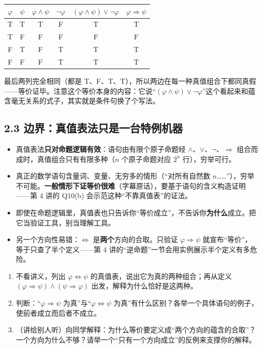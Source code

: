 \documentclass[UTF8,a4paper,11pt]{ctexart}
\begin{document}
\begin{center}
\begin{tabular}{cc|c|c|c|c}
\toprule
$\varphi$ & $\psi$ & $\varphi \land \psi$ & $\neg \varphi$ & $(\varphi \land \psi) \lor \neg \varphi$ & $\varphi \Rightarrow \psi$ \\
\midrule
T & T & T & F & T & T \\
T & F & F & F & F & F \\
F & T & F & T & T & T \\
F & F & F & T & T & T \\
\bottomrule
\end{tabular}
\end{center}

最后两列完全相同（都是 T、F、T、T），所以两边在每一种真值组合下都同真假——等价证毕。注意这个等价本身的内容：它说“$(\varphi \land \psi) \lor \neg \varphi$”这个看起来和蕴含毫无关系的式子，其实就是条件句换了个写法。

\subsection*{2.3 边界：真值表法只是一台特例机器}

\begin{keyconcept}
\begin{itemize}
  \item 真值表法\textbf{只对命题逻辑有效}：语句由有限个原子命题经 $\land$、$\lor$、$\neg$、$\Rightarrow$ 组合而成时，真值组合只有有限多种（$n$ 个原子命题对应 $2^n$ 行），穷举可行。
  \item 真正的数学语句含量词、变量、无穷多的情形（“对所有自然数 $n$……”），穷举不可能。\textbf{一般情形下证等价很难}（字幕原话），要基于语句的含义构造证明——第 4 讲的 Q10(b) 会示范这种“不靠真值表”的证法。
  \item 即使在命题逻辑里，真值表也只告诉你“等价成立”，不告诉你\textbf{为什么}成立。把它当验证工具，别当理解工具。
  \item 另一个方向性易错：$\Leftrightarrow$ 是\textbf{两个}方向的合取。只验证 $\varphi \Rightarrow \psi$ 就宣布“等价”，等于只查了半个定义——第 4 讲的“逆命题”一节会用实例展示半个定义有多危险。
\end{itemize}
\end{keyconcept}

\begin{exercise}[今日自测]
\begin{enumerate}
  \item 不看讲义，列出 $\varphi \Leftrightarrow \psi$ 的真值表，说出它为真的两种组合；再从定义 $(\varphi \Rightarrow \psi) \land (\psi \Rightarrow \varphi)$ 出发，解释为什么恰好是这两种。
  \item 判断：“$\varphi \Rightarrow \psi$ 为真”与“$\varphi \Leftrightarrow \psi$ 为真”有什么区别？各举一个具体语句的例子，使前者成立而后者不成立。
  \item （讲给别人听）向同学解释：为什么等价要定义成“两个方向的蕴含的合取”？一个方向为什么不够？请举一个“只有一个方向成立”的反例来支撑你的解释。
\end{enumerate}
\end{exercise}
\end{document}
